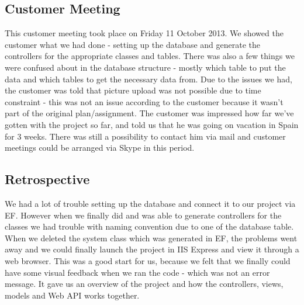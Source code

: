 \subsection{Customer Meeting}
This customer meeting took place on Friday 11 October 2013. We showed the customer what we had done - setting up the database and generate the controllers for the appropriate classes and tables. There was also a few things we were confused about in the database structure - mostly which table to put the data and which tables to get the necessary data from.
Due to the issues we had, the customer was told that picture upload was not possible due to time constraint - this was not an issue according to the customer because it wasn't part of the original plan/assignment.
The customer was impressed how far we've gotten with the project so far, and told us that he was going on vacation in Spain for 3 weeks. There was still a possibility to contact him via mail and customer meetings could be arranged via Skype in this period. 


\subsection{Retrospective}
We had a lot of trouble setting up the database and connect it to our project via EF. However when we finally did and was able to generate controllers for the classes we had trouble with naming convention due to one of the database table. When we deleted the system class which was generated in EF, the problems went away and we could finally launch the project in IIS Express and view it through a web browser. This was a good start for us, because we felt that we finally could have some visual feedback when we ran the code - which was not an error message. It gave us an overview of the project and how the controllers, views, models and Web API works together.  %